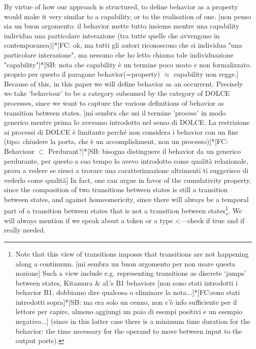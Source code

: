\documentclass[sw]{iosart2x}
\newcommand{\DOLCE}{\textsc{DOLCE}\xspace} %
\newcommand{\TODO}[1]{{\color{red} #1}}
\begin{document}
{By virtue of how our approach is structured, to define behavior as a property would make it very similar to a capability, or to the realisation of one.\TODO{[non penso sia un buon argomento: il behavior mette tutto insieme mentre una capability individua una particolare interazione (tra tutte quelle che avvengono in contemporanea)]*[FC: ok, ma tutti gli autori riconoscono che si individua "una particolare interazione", ma nessuno che ho letto chiama tale individuazione "capability"]*[SB: nota che capability è un termine poco usato e non formalizzato. proprio per questo il paragone behavior(=property) $\approx$ capability non regge.]}  
Because of this, in this paper we will define behavior as an occurrent. 
Precisely we take `behaviour' to be a category subsumed by the category of \DOLCE processes, since we want to capture the various definitions of behavior as transition between states.\TODO{[mi sembra che usi il termine 'process' in modo generico mentre prima lo avevamo introdotto nel senso di \DOLCE. La restrizione ai processi di \DOLCE è limitante perché non considera i behavior con un fine (tipo: chiudere la porta, che è un accomplishment, non un processo)]*[FC: Behaviour $\subset$ Perdurant?]*[SB: bisogna distinguere il behavior da un generico perdurante, per questo a suo tempo lo avevo introdotto come qualità relazionale, prova a vedere se riesci a trovare una caratterizzazione altrimenti ti suggerisco di vederlo come qualità]}
In fact, one can argue in favor of the cumulativity property, since the composition of two transitions between states is still a transition between states, and against homeomericity, since there will always be a temporal part of a transition between states that is not a transition between states\footnote{Note that this view of transitions imposes that transitions are not happening along a continuum.\TODO{[mi sembra un buon argomento per non usare questa nozione]} Such a view include e.g. representing transitions as discrete `jumps' between states, Kitamura \& al.'s B1 behaviors\TODO{[non sono stati introdotti i behavior B1, dobbiamo dire qualcosa o eliminare la nota...]*[FC:sono stati introdotti sopra]*[SB: ma era solo un cenno, non c'è info sufficiente per il lettore per capire, almeno aggiungi un paio di esempi positivi e un esempio negativo...]} (since in this latter case there is a minimum time duration for the behavior: the time necessary for the operand to move between input to the output ports).}}.  
We will always mention if we speak about a token or a type \TODO{<---check if true and if really needed}.
\end{document}
